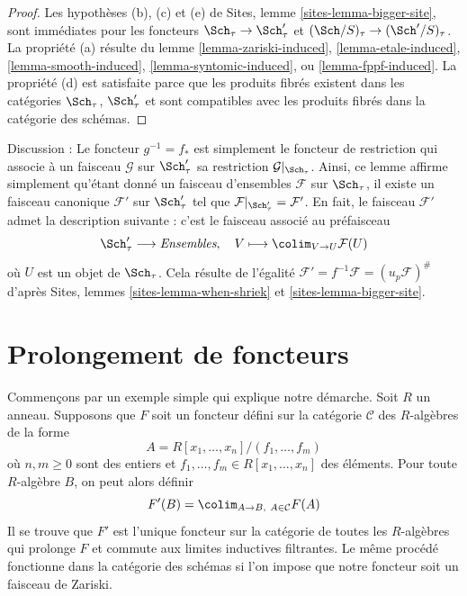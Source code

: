 \begin{proof}
Les hypothèses (b), (c) et (e) de
Sites, lemme \ref{sites-lemma-bigger-site},
sont immédiates pour les foncteurs
$\Sch_\tau \to \Sch'_\tau$ et
$(\Sch/S)_\tau \to (\Sch'/S)_\tau$. La propriété (a) résulte du
lemme \ref{lemma-zariski-induced},
\ref{lemma-etale-induced},
\ref{lemma-smooth-induced},
\ref{lemma-syntomic-induced}, ou
\ref{lemma-fppf-induced}.
La propriété (d) est satisfaite parce que
les produits fibrés existent dans les catégories $\Sch_\tau$, $\Sch'_\tau$
et sont compatibles avec les produits fibrés dans la catégorie des schémas.
\end{proof}

\noindent
Discussion :
Le foncteur $g^{-1} = f_*$ est simplement le foncteur de restriction qui associe
à un faisceau $\mathcal{G}$ sur $\Sch'_\tau$ sa restriction
$\mathcal{G}|_{\Sch_\tau}$. Ainsi, ce lemme affirme simplement qu'étant donné
un faisceau d'ensembles $\mathcal{F}$ sur $\Sch_\tau$, il existe un
faisceau canonique $\mathcal{F}'$ sur $\Sch'_\tau$ tel que
$\mathcal{F}|_{\Sch'_\tau} = \mathcal{F}'$. En fait, le faisceau
$\mathcal{F}'$ admet la description suivante : c'est le faisceau associé
au préfaisceau
$$
\Sch'_\tau \longrightarrow \textit{Ensembles}, \quad
V \longmapsto \colim_{V \to U} \mathcal{F}(U)
$$
où $U$ est un objet de $\Sch_\tau$. Cela résulte de l'égalité
$\mathcal{F}' = f^{-1}\mathcal{F} = (u_p\mathcal{F})^\#$ d'après
Sites, lemmes \ref{sites-lemma-when-shriek} et \ref{sites-lemma-bigger-site}.






\section{Prolongement de foncteurs}
\label{section-extending-functors}

\noindent
Commençons par un exemple simple qui explique notre démarche.
Soit $R$ un anneau. Supposons que $F$ soit un foncteur défini sur la catégorie
$\mathcal{C}$ des $R$-algèbres de la forme
$$
A = R[x_1, \ldots, x_n]/(f_1, \ldots, f_m)
$$
où $n, m \geq 0$ sont des entiers et $f_1, \ldots, f_m \in R[x_1, \ldots, x_n]$
des éléments. Pour toute $R$-algèbre $B$, on peut alors définir
$$
F'(B) = \colim_{A \to B,\ A \in \mathcal{C}} F(A)
$$
Il se trouve que $F'$ est l'unique foncteur sur la catégorie
de toutes les $R$-algèbres qui prolonge $F$ et commute aux limites
inductives filtrantes. Le même procédé fonctionne dans la catégorie des schémas
si l'on impose que notre foncteur soit un faisceau de Zariski.

